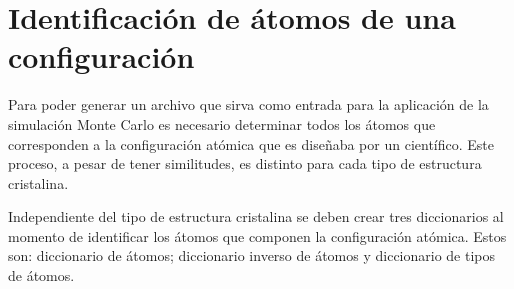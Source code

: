 \section{Identificación de átomos de una configuración}

Para poder generar un archivo que sirva como entrada para la aplicación de la simulación Monte Carlo es necesario determinar todos los átomos que corresponden a la configuración atómica que es diseñaba por un científico. Este proceso, a pesar de tener similitudes, es distinto para cada tipo de estructura cristalina.

Independiente del tipo de estructura cristalina se deben crear tres diccionarios al momento de identificar los átomos que componen la configuración atómica. Estos son: diccionario de átomos; diccionario inverso de átomos y diccionario de tipos de átomos.

